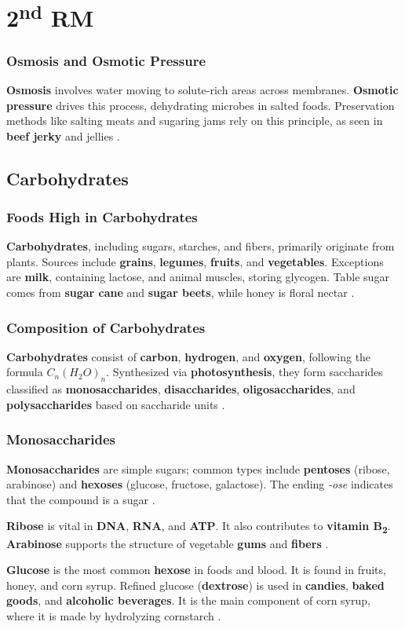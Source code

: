 \section{2\texorpdfstring{\textsuperscript{nd}}{nd} RM}
\subsubsection*{Osmosis and Osmotic Pressure}
\textbf{Osmosis} involves water moving to solute-rich areas across membranes. \textbf{Osmotic pressure} drives this process, dehydrating microbes in salted foods. Preservation methods like salting meats and sugaring jams rely on this principle, as seen in \textbf{beef jerky} and jellies \cite*{BKR_02}.

\subsection*{Carbohydrates}
\subsubsection*{Foods High in Carbohydrates}
\textbf{Carbohydrates}, including sugars, starches, and fibers, primarily originate from plants. Sources include \textbf{grains}, \textbf{legumes}, \textbf{fruits}, and \textbf{vegetables}. Exceptions are \textbf{milk}, containing lactose, and animal muscles, storing glycogen. Table sugar comes from \textbf{sugar cane} and \textbf{sugar beets}, while honey is floral nectar \cite*{BKR_02}.

\subsubsection*{Composition of Carbohydrates}
\textbf{Carbohydrates} consist of \textbf{carbon}, \textbf{hydrogen}, and \textbf{oxygen}, following the formula $C_n(H_2O)_n$. Synthesized via \textbf{photosynthesis}, they form saccharides classified as \textbf{monosaccharides}, \textbf{disaccharides}, \textbf{oligosaccharides}, and \textbf{polysaccharides} based on saccharide units \cite*{BKR_02}.

\subsubsection*{Monosaccharides}
\textbf{Monosaccharides} are simple sugars; common types include \textbf{pentoses} (ribose, arabinose) and \textbf{hexoses} (glucose, fructose, galactose). The ending \textit{-ose} indicates that the compound is a sugar \cite*{BKR_02}.

\textbf{Ribose} is vital in \textbf{DNA}, \textbf{RNA}, and \textbf{ATP}. It also contributes to \textbf{vitamin B\textsubscript{2}}. \textbf{Arabinose} supports the structure of vegetable \textbf{gums} and \textbf{fibers} \cite*{BKR_02}.

\textbf{Glucose} is the most common \textbf{hexose} in foods and blood. It is found in fruits, honey, and corn syrup. Refined glucose (\textbf{dextrose}) is used in \textbf{candies}, \textbf{baked goods}, and \textbf{ alcoholic beverages}. It is the main component of corn syrup, where it is made by hydrolyzing cornstarch \cite*{BKR_02}.
